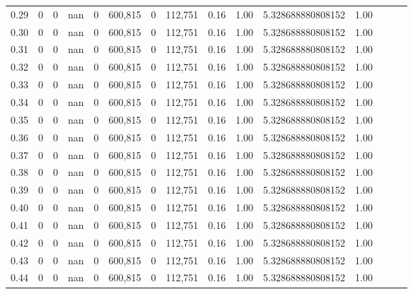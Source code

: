 \begin{tabular}{rrrrrrrrrrrrrrr}
0.29 &        0 &       0 &   nan &        0 &  600,815 &        0 &  112,751 &  0.16 &  1.00 &    5.328688880808152 &      1.00 \\
0.30 &        0 &       0 &   nan &        0 &  600,815 &        0 &  112,751 &  0.16 &  1.00 &    5.328688880808152 &      1.00 \\
0.31 &        0 &       0 &   nan &        0 &  600,815 &        0 &  112,751 &  0.16 &  1.00 &    5.328688880808152 &      1.00 \\
0.32 &        0 &       0 &   nan &        0 &  600,815 &        0 &  112,751 &  0.16 &  1.00 &    5.328688880808152 &      1.00 \\
0.33 &        0 &       0 &   nan &        0 &  600,815 &        0 &  112,751 &  0.16 &  1.00 &    5.328688880808152 &      1.00 \\
0.34 &        0 &       0 &   nan &        0 &  600,815 &        0 &  112,751 &  0.16 &  1.00 &    5.328688880808152 &      1.00 \\
0.35 &        0 &       0 &   nan &        0 &  600,815 &        0 &  112,751 &  0.16 &  1.00 &    5.328688880808152 &      1.00 \\
0.36 &        0 &       0 &   nan &        0 &  600,815 &        0 &  112,751 &  0.16 &  1.00 &    5.328688880808152 &      1.00 \\
0.37 &        0 &       0 &   nan &        0 &  600,815 &        0 &  112,751 &  0.16 &  1.00 &    5.328688880808152 &      1.00 \\
0.38 &        0 &       0 &   nan &        0 &  600,815 &        0 &  112,751 &  0.16 &  1.00 &    5.328688880808152 &      1.00 \\
0.39 &        0 &       0 &   nan &        0 &  600,815 &        0 &  112,751 &  0.16 &  1.00 &    5.328688880808152 &      1.00 \\
0.40 &        0 &       0 &   nan &        0 &  600,815 &        0 &  112,751 &  0.16 &  1.00 &    5.328688880808152 &      1.00 \\
0.41 &        0 &       0 &   nan &        0 &  600,815 &        0 &  112,751 &  0.16 &  1.00 &    5.328688880808152 &      1.00 \\
0.42 &        0 &       0 &   nan &        0 &  600,815 &        0 &  112,751 &  0.16 &  1.00 &    5.328688880808152 &      1.00 \\
0.43 &        0 &       0 &   nan &        0 &  600,815 &        0 &  112,751 &  0.16 &  1.00 &    5.328688880808152 &      1.00 \\
0.44 &        0 &       0 &   nan &        0 &  600,815 &        0 &  112,751 &  0.16 &  1.00 &    5.328688880808152 &      1.00 \\

\end{tabular}

